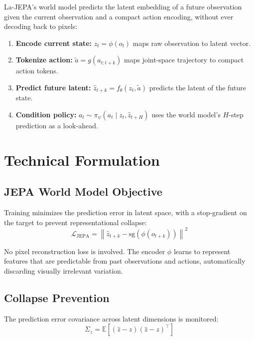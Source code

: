 \documentclass[10pt,twocolumn]{article}
\begin{document}
La-JEPA's world model predicts the latent embedding of a future observation given the current observation and a compact action encoding, without ever decoding back to pixels:

\begin{enumerate}[leftmargin=1.5em,itemsep=2pt]
  \item \textbf{Encode current state:} $z_t = \phi(o_t)$ maps raw observation to latent vector.
  \item \textbf{Tokenize action:} $\tilde{a} = g(a_{t:t+k})$ maps joint-space trajectory to compact action tokens.
  \item \textbf{Predict future latent:} $\hat{z}_{t+k} = f_\theta(z_t, \tilde{a})$ predicts the latent of the future state.
  \item \textbf{Condition policy:} $a_t \sim \pi_\psi(a_t \mid z_t, \hat{z}_{t+H})$ uses the world model's $H$-step prediction as a look-ahead.
\end{enumerate}

\section{Technical Formulation}

\subsection*{JEPA World Model Objective}

Training minimizes the prediction error in latent space, with a stop-gradient on the target to prevent representational collapse:
\begin{equation}
\mathcal{L}_{\mathrm{JEPA}} = \left\|\hat{z}_{t+k} - \mathrm{sg}\!\left(\phi(o_{t+k})\right)\right\|^2
\label{eq:jepa}
\end{equation}

No pixel reconstruction loss is involved.
The encoder $\phi$ learns to represent features that are predictable from past observations and actions, automatically discarding visually irrelevant variation.

\subsection*{Collapse Prevention}

The prediction error covariance across latent dimensions is monitored:
\begin{equation}
\Sigma_z = \mathbb{E}\!\left[(\hat{z} - z)(\hat{z} - z)^\top\right]
\label{eq:cov}
\end{equation}
\end{document}
